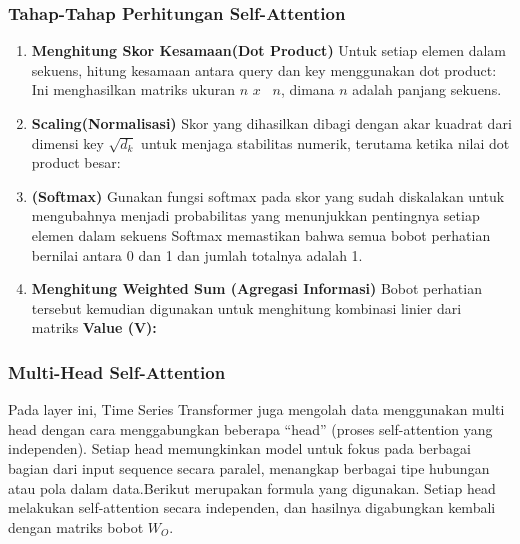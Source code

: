 \subsubsection{Tahap-Tahap Perhitungan Self-Attention}
\begin{enumerate}
    \item \textbf{Menghitung Skor Kesamaan(Dot Product)}
    Untuk setiap elemen dalam sekuens, hitung kesamaan antara query dan key menggunakan dot product:
    Ini menghasilkan matriks ukuran \( n \) \( x \) \ \( n \), dimana \( n \) adalah panjang sekuens.

    \item\textbf{Scaling(Normalisasi)}
    Skor yang dihasilkan dibagi dengan akar kuadrat dari dimensi key \(\sqrt{d_k} \)  untuk menjaga stabilitas numerik, terutama ketika nilai dot product besar:

    
    \item\textbf{(Softmax)}
    Gunakan fungsi softmax pada skor yang sudah diskalakan untuk mengubahnya menjadi probabilitas yang menunjukkan pentingnya setiap elemen dalam sekuens
    Softmax memastikan bahwa semua bobot perhatian bernilai antara 0 dan 1 dan jumlah totalnya adalah 1.
    \item\textbf{Menghitung Weighted Sum (Agregasi Informasi)}
    Bobot perhatian tersebut kemudian digunakan untuk menghitung kombinasi linier dari matriks \textbf{Value (V):}
\end{enumerate}

\subsubsection{Multi-Head Self-Attention}
Pada layer ini, Time Series Transformer juga mengolah data menggunakan multi head dengan cara menggabungkan beberapa “head” (proses self-attention yang independen). Setiap head memungkinkan model untuk fokus pada berbagai bagian dari input sequence secara paralel, menangkap berbagai tipe hubungan atau pola dalam data.Berikut merupakan formula yang digunakan.
Setiap head melakukan self-attention secara independen, dan hasilnya digabungkan kembali dengan matriks bobot \( W_O \).

